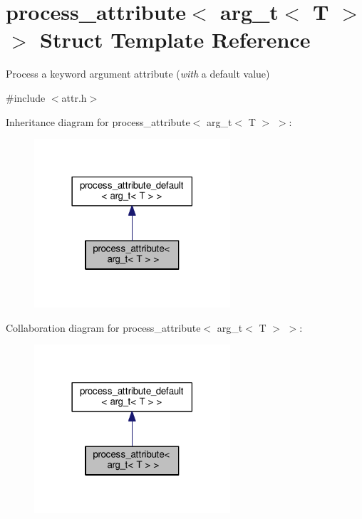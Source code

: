 \hypertarget{structprocess__attribute_3_01arg__t_3_01_t_01_4_01_4}{}\section{process\+\_\+attribute$<$ arg\+\_\+t$<$ T $>$ $>$ Struct Template Reference}
\label{structprocess__attribute_3_01arg__t_3_01_t_01_4_01_4}


Process a keyword argument attribute ({\itshape with} a default value)  




{\ttfamily \#include $<$attr.\+h$>$}



Inheritance diagram for process\+\_\+attribute$<$ arg\+\_\+t$<$ T $>$ $>$\+:
\nopagebreak
\begin{figure}[H]
\begin{center}
\leavevmode
\includegraphics[width=206pt]{structprocess__attribute_3_01arg__t_3_01_t_01_4_01_4__inherit__graph}
\end{center}
\end{figure}


Collaboration diagram for process\+\_\+attribute$<$ arg\+\_\+t$<$ T $>$ $>$\+:
\nopagebreak
\begin{figure}[H]
\begin{center}
\leavevmode
\includegraphics[width=206pt]{structprocess__attribute_3_01arg__t_3_01_t_01_4_01_4__coll__graph}
\end{center}
\end{figure}
